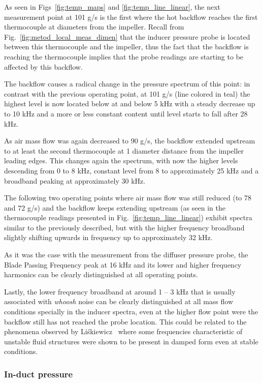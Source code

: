 As seen in Figs~\ref{fig:temp_maps} and \ref{fig:temp_line_linear}, the next measurement point at 101 g/s is the first where the hot backflow reaches the first thermocouple at  diameters from the impeller. Recall from Fig.~\ref{fig:metod_local_meas_dimen} that the inducer pressure probe is located between this thermocouple and the impeller, thus the fact that the backflow is reaching the thermocouple implies that the probe readings are starting to be affected by this backflow.

The backflow causes a radical change in the pressure spectrum of this point: in contrast with the previous operating point, at 101 g/s (line colored in teal) the highest level is now located below at and below 5 kHz with a steady decrease up to 10 kHz and a more or less constant content until level starts to fall after 28 kHz.

As air mass flow was again decreased to 90 g/s, the backflow extended upstream to at least the second thermocouple at 1 diameter distance from the impeller leading edges. This changes again the spectrum, with now the higher levels descending from 0 to 8 kHz, constant level from 8 to approximately 25 kHz and a broadband peaking at approximately 30 kHz.

The following two operating points where air mass flow was still reduced (to 78 and 72 g/s) and the backflow keeps extending upstream (as seen in the thermocouple readings presented in Fig.~\ref{fig:temp_line_linear}) exhibit spectra similar to the previously described, but with the higher frequency broadband slightly shifting upwards in frequency up to approximately 32 kHz.

As it was the case with the measurement from the diffuser pressure probe, the Blade Passing Frequency peak at 16 kHz and its lower and higher frequency harmonics can be clearly distinguished at all operating points.

Lastly, the lower frequency broadband at around 1 -- 3 kHz that is usually associated with \emph{whoosh} noise can be clearly distinguished at all mass flow conditions specially in the inducer spectra, even at the higher flow point were the backflow still has not reached the probe location. This could be related to the phenomena observed by Li\'skiewicz~\cite{liskiewicz2014id} where some frequencies characteristic of unstable fluid structures were shown to be present in damped form even at stable conditions.

\subsubsection{In-duct pressure}

